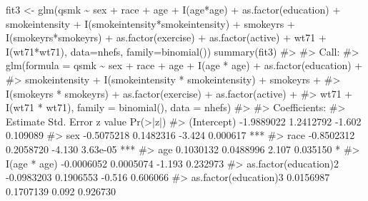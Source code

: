 \documentclass[
  10pt,
  a4paper,
]{book}
\newenvironment{Shaded}{\begin{snugshade}}{\end{snugshade}}
\newcommand{\AttributeTok}[1]{\textcolor[rgb]{0.40,0.45,0.13}{#1}}
\newcommand{\CommentTok}[1]{\textcolor[rgb]{0.37,0.37,0.37}{#1}}
\newcommand{\FunctionTok}[1]{\textcolor[rgb]{0.28,0.35,0.67}{#1}}
\newcommand{\NormalTok}[1]{\textcolor[rgb]{0.00,0.46,0.62}{#1}}
\newcommand{\OtherTok}[1]{\textcolor[rgb]{0.00,0.46,0.62}{#1}}
\newcommand{\SpecialCharTok}[1]{\textcolor[rgb]{0.37,0.37,0.37}{#1}}
\begin{document}
\begin{Shaded}
\begin{Highlighting}[]
\NormalTok{fit3 }\OtherTok{\textless{}{-}} \FunctionTok{glm}\NormalTok{(qsmk }\SpecialCharTok{\textasciitilde{}}\NormalTok{ sex }\SpecialCharTok{+}\NormalTok{ race }\SpecialCharTok{+}\NormalTok{ age }\SpecialCharTok{+} \FunctionTok{I}\NormalTok{(age}\SpecialCharTok{*}\NormalTok{age) }\SpecialCharTok{+} \FunctionTok{as.factor}\NormalTok{(education)}
            \SpecialCharTok{+}\NormalTok{ smokeintensity }\SpecialCharTok{+} \FunctionTok{I}\NormalTok{(smokeintensity}\SpecialCharTok{*}\NormalTok{smokeintensity) }\SpecialCharTok{+}\NormalTok{ smokeyrs}
            \SpecialCharTok{+} \FunctionTok{I}\NormalTok{(smokeyrs}\SpecialCharTok{*}\NormalTok{smokeyrs) }\SpecialCharTok{+} \FunctionTok{as.factor}\NormalTok{(exercise) }\SpecialCharTok{+} \FunctionTok{as.factor}\NormalTok{(active)}
            \SpecialCharTok{+}\NormalTok{ wt71 }\SpecialCharTok{+} \FunctionTok{I}\NormalTok{(wt71}\SpecialCharTok{*}\NormalTok{wt71), }\AttributeTok{data=}\NormalTok{nhefs, }\AttributeTok{family=}\FunctionTok{binomial}\NormalTok{())}
\FunctionTok{summary}\NormalTok{(fit3)}
\CommentTok{\#\textgreater{} }
\CommentTok{\#\textgreater{} Call:}
\CommentTok{\#\textgreater{} glm(formula = qsmk \textasciitilde{} sex + race + age + I(age * age) + as.factor(education) + }
\CommentTok{\#\textgreater{}     smokeintensity + I(smokeintensity * smokeintensity) + smokeyrs + }
\CommentTok{\#\textgreater{}     I(smokeyrs * smokeyrs) + as.factor(exercise) + as.factor(active) + }
\CommentTok{\#\textgreater{}     wt71 + I(wt71 * wt71), family = binomial(), data = nhefs)}
\CommentTok{\#\textgreater{} }
\CommentTok{\#\textgreater{} Coefficients:}
\CommentTok{\#\textgreater{}                                      Estimate Std. Error z value Pr(\textgreater{}|z|)    }
\CommentTok{\#\textgreater{} (Intercept)                        {-}1.9889022  1.2412792  {-}1.602 0.109089    }
\CommentTok{\#\textgreater{} sex                                {-}0.5075218  0.1482316  {-}3.424 0.000617 ***}
\CommentTok{\#\textgreater{} race                               {-}0.8502312  0.2058720  {-}4.130 3.63e{-}05 ***}
\CommentTok{\#\textgreater{} age                                 0.1030132  0.0488996   2.107 0.035150 *  }
\CommentTok{\#\textgreater{} I(age * age)                       {-}0.0006052  0.0005074  {-}1.193 0.232973    }
\CommentTok{\#\textgreater{} as.factor(education)2              {-}0.0983203  0.1906553  {-}0.516 0.606066    }
\CommentTok{\#\textgreater{} as.factor(education)3               0.0156987  0.1707139   0.092 0.926730    }

\end{Highlighting}
\end{Shaded}
\end{document}
